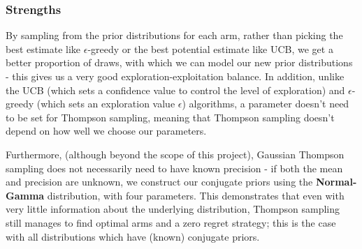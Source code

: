 \subsubsection{Strengths}
By sampling from the prior distributions for each arm, rather than picking the best estimate like $\epsilon$-greedy or the best potential estimate like UCB, we get a better proportion of draws, with which we can model our new prior distributions - this gives us a very good exploration-exploitation balance.
In addition, unlike the UCB (which sets a confidence value to control the level of exploration) and $\epsilon$-greedy (which sets an exploration value $\epsilon$) algorithms, a parameter doesn't need to be set for Thompson sampling, meaning that Thompson sampling doesn't depend on how well we choose our parameters.

Furthermore, (although beyond the scope of this project), Gaussian Thompson sampling does not necessarily need to have known precision - if both the mean and precision are unknown, we construct our conjugate priors using the \textbf{Normal-Gamma} distribution, with four parameters.
This demonstrates that even with very little information about the underlying distribution, Thompson sampling still manages to find optimal arms and a zero regret strategy;
this is the case with all distributions which have (known) conjugate priors.

